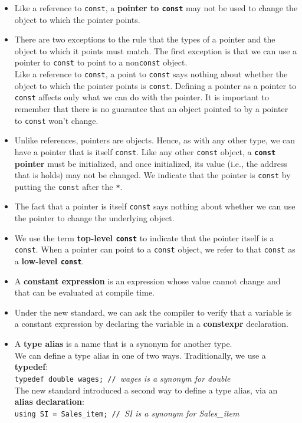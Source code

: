 \begin{itemize}
\item
Like a reference to \texttt{const}, a \textbf{pointer to \texttt{const}} may not be used to change the object to which the pointer points.

\item
There are two exceptions to the rule that the types of a pointer and the object to which it points must match. The first exception is that we can use a pointer to \texttt{const} to point to a non\texttt{const} object.\\
Like a reference to \texttt{const}, a point to \texttt{const} says nothing about whether the object to which the pointer points is \texttt{const}. Defining a pointer as a pointer to \texttt{const} affects only what we can do with the pointer. It is important to remember that there is no guarantee that an object pointed to by a pointer to \texttt{const} won't change.

\item
Unlike references, pointers are objects. Hence, as with any other type, we can have a pointer that is itself \texttt{const}. Like any other \texttt{const} object, a \textbf{\texttt{const} pointer} must be initialized, and once initialized, its value (i.e., the address that is holds) may not be changed. We indicate that the pointer is \texttt{const} by putting the \texttt{const} after the \texttt{*}.

\item
The fact that a pointer is itself \texttt{const} says nothing about whether we can use the pointer to change the underlying object.

\item
We use the term \textbf{top-level \texttt{const}} to indicate that the pointer itself is a \texttt{const}. When a pointer can point to a \texttt{const} object, we refer to that \texttt{const} as a \textbf{low-level \texttt{const}}.

\item
A \textbf{constant expression} is an expression whose value cannot change and that can be evaluated at compile time.

\item
Under the new standard, we can ask the compiler to verify that a variable is a constant expression by declaring the variable in a \textbf{constexpr} declaration.

\item
A \textbf{type alias} is a name that is a synonym for another type.\\
We can define a type alias in one of two ways. Traditionally, we use a \textbf{typedef}:\\
\hspace*{1em}\texttt{typedef double wages; // }\textit{wages is a synonym for double}\\
The new standard introduced a second way to define a type alias, via an \textbf{alias declaration}:\\
\hspace*{1em}\texttt{using SI = Sales\_item; // }\textit{SI is a synonym for Sales\_item}


\end{itemize}
